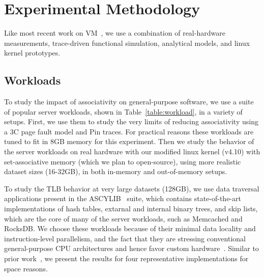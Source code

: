 \section{Experimental Methodology}
\label{sec:methodology}

Like most recent work on VM~\cite{basu:efficient, pham:increasing, pham:colt, bhattacharjee:large-reach, barr:spectlb, papadopoulou:prediction-based, saulsbury:recently-based}, we use a combination of real-hardware measurements, trace-driven functional simulation, analytical models, and linux kernel prototypes.

\subsection{Workloads}

To study the impact of associativity on general-purpose software, we use a suite of popular server workloads, shown in Table~\ref{table:workload}, in a variety of setups. First, we use them to study the very limits of reducing associativity using a 3C page fault model and Pin traces. For practical reasons these workloads are tuned to fit in 8GB memory for this experiment. Then we study the behavior of the server workloads on real hardware with our modified linux kernel (v4.10) with set-associative memory (which we plan to open-source), using more realistic dataset sizes (16-32GB), in both in-memory and out-of-memory setups.

To study the TLB behavior at very large datasets (128GB), we use  data traversal applications present in the ASCYLIB~\cite{david:asynchronized} suite, which contains state-of-the-art implementations of hash tables, extarnal and internal binary trees, and skip lists, which are the core of many of the server workloads, such as Memcached and RocksDB. We choose these workloads because of their minimal data locality and instruction-level parallelism, and the fact that they are stressing conventional general-purpose CPU architectures and hence favor custom hardware~\cite{ haria:devirtualizing, picorel:near-memory, kocberber:meet, hsieh:accelerating}. Similar to prior work~\cite{picorel:near-memory}, we present the results for four representative implementations for space reasons. 


